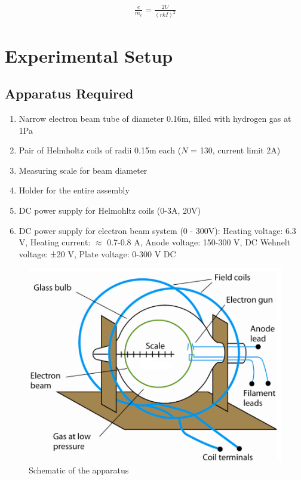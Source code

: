 \begin{align}
    \frac{e}{m_e} = \frac{2U}{(rkI)^2}
\end{align}
    
\section{Experimental Setup}

\subsection*{Apparatus Required}
\begin{enumerate}
    \item Narrow electron beam tube of diameter 0.16m, filled with hydrogen gas at  1Pa
    \item Pair of Helmholtz coils of radii 0.15m each ($N$ = 130, current limit 2A)
    \item Measuring scale for beam diameter
    \item Holder for the entire assembly
    \item DC power supply for Helmohltz coils (0-3A, 20V)
    \item DC power supply for electron beam system (0 - 300V): Heating voltage: 6.3 V, Heating current: $\approx$ 0.7-0.8 A, Anode voltage: 150-300 V, DC Wehnelt voltage: ±20 V, Plate voltage: 0-300 V DC
\end{enumerate}

\begin{figure}[H]
    \centering
    \includegraphics[height=0.7\columnwidth]{images/f2.png}
    \caption{Schematic of the apparatus}
    \label{fig:2}
\end{figure}

